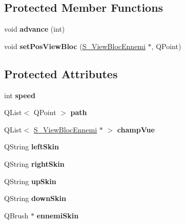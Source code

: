 \subsection*{Protected Member Functions}
\begin{DoxyCompactItemize}
\item 
\hypertarget{class_ennemi_afc6832bb7b5969ac0e13f87c643a5ce2}{}void {\bfseries advance} (int)\label{class_ennemi_afc6832bb7b5969ac0e13f87c643a5ce2}

\item 
\hypertarget{class_ennemi_a239561a109368460aaae98da30938dc4}{}void {\bfseries set\+Pos\+View\+Bloc} (\hyperlink{class_s___view_bloc_ennemi}{S\+\_\+\+View\+Bloc\+Ennemi} $\ast$, Q\+Point)\label{class_ennemi_a239561a109368460aaae98da30938dc4}

\end{DoxyCompactItemize}
\subsection*{Protected Attributes}
\begin{DoxyCompactItemize}
\item 
\hypertarget{class_ennemi_abf051ea1d034df4a8b0480e9387f2008}{}int {\bfseries speed}\label{class_ennemi_abf051ea1d034df4a8b0480e9387f2008}

\item 
\hypertarget{class_ennemi_a4ddf1ae5a5662a8206dc6f4a3aac6fbf}{}Q\+List$<$ Q\+Point $>$ {\bfseries path}\label{class_ennemi_a4ddf1ae5a5662a8206dc6f4a3aac6fbf}

\item 
\hypertarget{class_ennemi_aabd4b33e091ce69e811959720e14dde6}{}Q\+List$<$ \hyperlink{class_s___view_bloc_ennemi}{S\+\_\+\+View\+Bloc\+Ennemi} $\ast$ $>$ {\bfseries champ\+Vue}\label{class_ennemi_aabd4b33e091ce69e811959720e14dde6}

\item 
\hypertarget{class_ennemi_a5537ad37a49d572d09a76749238490c2}{}Q\+String {\bfseries left\+Skin}\label{class_ennemi_a5537ad37a49d572d09a76749238490c2}

\item 
\hypertarget{class_ennemi_ab63f4a7fbff796d8c368bd49e254561a}{}Q\+String {\bfseries right\+Skin}\label{class_ennemi_ab63f4a7fbff796d8c368bd49e254561a}

\item 
\hypertarget{class_ennemi_abe2b3007be5ed71b5547a66407b8db3e}{}Q\+String {\bfseries up\+Skin}\label{class_ennemi_abe2b3007be5ed71b5547a66407b8db3e}

\item 
\hypertarget{class_ennemi_a3a72c0537216823ea706923d20f9ed5a}{}Q\+String {\bfseries down\+Skin}\label{class_ennemi_a3a72c0537216823ea706923d20f9ed5a}

\item 
\hypertarget{class_ennemi_afed643ae9412716c1f1caabfdea06fc0}{}Q\+Brush $\ast$ {\bfseries ennemi\+Skin}\label{class_ennemi_afed643ae9412716c1f1caabfdea06fc0}

\end{DoxyCompactItemize}


